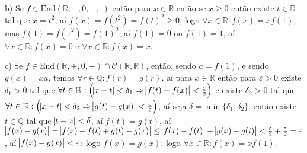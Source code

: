 \documentclass[10pt,a4paper]{article}
\begin{document}
\medskip
\noindent
b) Se $f\in\mathrm{End}(\mathbb{R},+,0,-,\cdot)$ então para $x\in\mathbb{R}$ então se $x\geq 0$ então existe $t\in\mathbb{R}$ tal que $x=t^2$, aí $f(x)=f(t^2)=f(t)^2\geq 0$; logo $\forall x\in\mathbb{R}:f(x)=xf(1)$, mas $f(1)=f(1^2)=f(1)^2$, aí $f(1)=0$ ou $f(1)=1$, aí $\forall x\in\mathbb{R}:f(x)=0$ e $\forall x\in\mathbb{R}:f(x)=x$.

\medskip
\noindent
c) Se $f\in\mathrm{End}(\mathbb{R},+,0,-)\cap\mathcal{C}(\mathbb{R},\mathbb{R})$, então, sendo $a=f(1)$, e sendo $g(x)=xa$, temos $\forall r\in\mathbb{Q}:f(r)=g(r)$, aí para $x\in\mathbb{R}$ então para $\varepsilon>0$ existe $\delta_1>0$ tal que $\forall t\in\mathbb{R}:\left(\abs{x-t}<\delta_1\Rightarrow\abs{f(t)-f(x)}<\frac{\varepsilon}{2}\right)$ e existe $\delta_2>0$ tal que $\forall t\in\mathbb{R}:\left(\abs{x-t}<\delta_2\Rightarrow\abs{g(t)-g(x)}<\frac{\varepsilon}{2}\right)$, aí seja $\delta=\min\{\delta_1,\delta_2\}$, então existe $t\in\mathbb{Q}$ tal que $\abs{t-x}<\delta$, aí $f(t)=g(t)$, aí $\abs{f(x)-g(x)}=\abs{f(x)-f(t)+g(t)-g(x)}\leq\abs{f(x)-f(t)}+\abs{g(x)-g(t)}<\frac{\varepsilon}{2}+\frac{\varepsilon}{2}=\varepsilon$, aí $\abs{f(x)-g(x)}<\varepsilon$; logo $f(x)=g(x)$; logo $\forall x\in\mathbb{R}:f(x)=xf(1)$.
\end{document}
